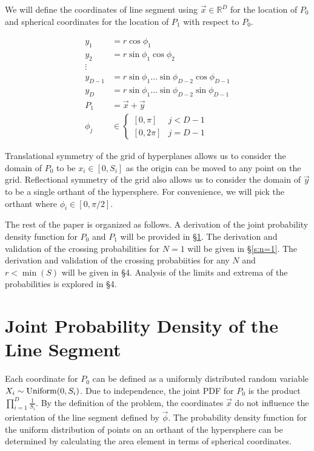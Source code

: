 \documentclass{article}
\begin{document}
We will define the coordinates of line segment using $\vec{x}\in\mathbb{R}^D$ for the location of $P_0$ and spherical coordinates for the location of $P_1$ with respect to $P_0$.

\begin{align*}
    y_1 &= r\cos{\phi_1}\\
    y_2 &= r\sin{\phi_1}\cos{\phi_2}\\
    \vdots\\
    y_{D-1} &= r\sin{\phi_1}\hdots\sin{\phi_{D-2}}\cos{\phi_{D-1}}\\
    y_{D} &= r\sin{\phi_1}\hdots\sin{\phi_{D-2}}\sin{\phi_{D-1}}\\
    P_1 &= \vec{x} + \vec{y}\\
	\phi_j &\in \begin{cases}[0, \pi] & j<D-1 \\ [0, 2\pi] & j=D-1\end{cases}
\end{align*}

Translational symmetry of the grid of hyperplanes allows us to consider the domain of $P_0$ to be $x_i\in[0,S_i]$ as the origin can be moved to any point on the grid.
Reflectional symmetry of the grid also allows us to consider the domain of $\vec{y}$ to be a single orthant of the hypersphere. For convenience, we will pick the orthant where
$\phi_i \in [0, \pi/2]$.

The rest of the paper is organized as follows. A derivation of the joint probability density function for $P_0$ and $P_1$ will be provided in \S \ref{s:needle pdf}. The derivation and validation
of the crossing probabilities for $N=1$ will be given in \S \ref{s:n=1}. The derivation and validation of the crossing probabiities for any $N$ and $r<\min(S)$ will be given in \S 4. Analysis of the limits
and extrema of the probabilities is explored in \S 4.

\section{Joint Probability Density of the Line Segment} \label{s:needle pdf}
Each coordinate for $P_0$ can be defined as a uniformly distributed random variable $X_i\sim{\rm Uniform}(0,S_i)$. Due to independence, the joint PDF for $P_0$ is the product
$\prod_{i=1}^D \frac{1}{S_i}$. By the definition of the problem, the coordinates $\vec{x}$ do not influence the orientation of the line segment defined by $\vec{\phi}$. 
The probability density function for the uniform distribution of points on an orthant of the hypersphere can be determined by calculating the area element in terms of spherical coordinates.
\end{document}
